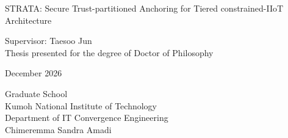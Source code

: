 \begin{titlepage}
\begin{center}
\Huge
STRATA: Secure Trust-partitioned Anchoring for Tiered constrained-IIoT Architecture\\

\vspace{1.5cm}
\LARGE

Supervisor: Taesoo Jun\\
\vspace{1.5cm}
\LARGE
Thesis presented for the degree of Doctor of Philosophy
\vfill
\LARGE

December 2026
\vspace{1cm} %
\LARGE %

Graduate School \\
Kumoh National Institute of Technology \\
\vspace{0.5cm} %
Department of IT Convergence Engineering \\
\vspace{0.5cm} %
\LARGE %
Chimeremma Sandra Amadi\vspace{1.5cm}
\end{center}
\end{titlepage}